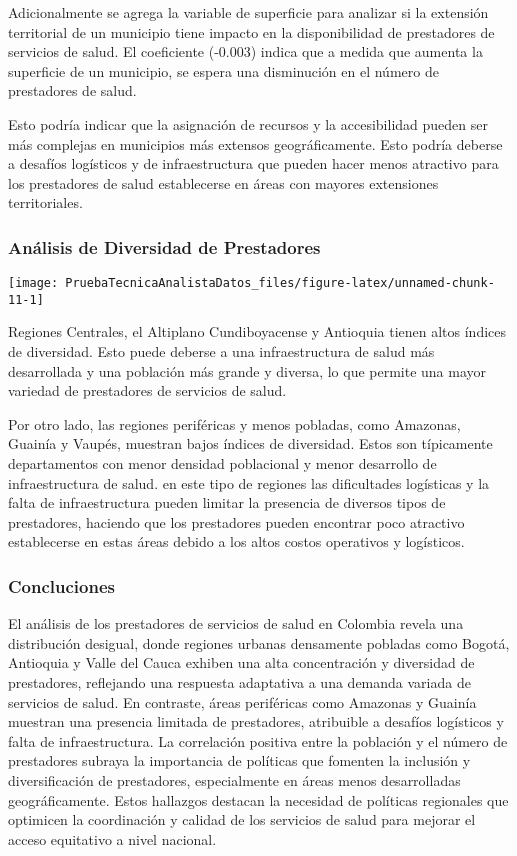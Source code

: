 \documentclass[
]{article}
\begin{document}
Adicionalmente se agrega la variable de superficie para analizar si la
extensión territorial de un municipio tiene impacto en la disponibilidad
de prestadores de servicios de salud. El coeficiente (-0.003) indica que
a medida que aumenta la superficie de un municipio, se espera una
disminución en el número de prestadores de salud.

Esto podría indicar que la asignación de recursos y la accesibilidad
pueden ser más complejas en municipios más extensos geográficamente.
Esto podría deberse a desafíos logísticos y de infraestructura que
pueden hacer menos atractivo para los prestadores de salud establecerse
en áreas con mayores extensiones territoriales.

\subsubsection{Análisis de Diversidad de
Prestadores}\label{anuxe1lisis-de-diversidad-de-prestadores}

\begin{center}\texttt{[image: PruebaTecnicaAnalistaDatos\_files/figure-latex/unnamed-chunk-11-1]} \end{center}

Regiones Centrales, el Altiplano Cundiboyacense y Antioquia tienen altos
índices de diversidad. Esto puede deberse a una infraestructura de salud
más desarrollada y una población más grande y diversa, lo que permite
una mayor variedad de prestadores de servicios de salud.

Por otro lado, las regiones periféricas y menos pobladas, como Amazonas,
Guainía y Vaupés, muestran bajos índices de diversidad. Estos son
típicamente departamentos con menor densidad poblacional y menor
desarrollo de infraestructura de salud. en este tipo de regiones las
dificultades logísticas y la falta de infraestructura pueden limitar la
presencia de diversos tipos de prestadores, haciendo que los prestadores
pueden encontrar poco atractivo establecerse en estas áreas debido a los
altos costos operativos y logísticos.

\subsubsection{Concluciones}\label{concluciones}

El análisis de los prestadores de servicios de salud en Colombia revela
una distribución desigual, donde regiones urbanas densamente pobladas
como Bogotá, Antioquia y Valle del Cauca exhiben una alta concentración
y diversidad de prestadores, reflejando una respuesta adaptativa a una
demanda variada de servicios de salud. En contraste, áreas periféricas
como Amazonas y Guainía muestran una presencia limitada de prestadores,
atribuible a desafíos logísticos y falta de infraestructura. La
correlación positiva entre la población y el número de prestadores
subraya la importancia de políticas que fomenten la inclusión y
diversificación de prestadores, especialmente en áreas menos
desarrolladas geográficamente. Estos hallazgos destacan la necesidad de
políticas regionales que optimicen la coordinación y calidad de los
servicios de salud para mejorar el acceso equitativo a nivel nacional.
\end{document}
